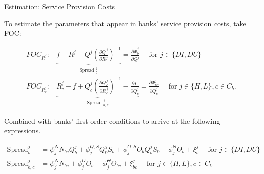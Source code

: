 \documentclass[notes,10pt, aspectratio=169]{beamer}
\newenvironment{wideitemize}{\itemize\addtolength{\itemsep}{10pt}}{\enditemize}
\begin{document}
\begin{frame}{Estimation: Service Provision Costs}

        \vspace{0.3cm}
        \begin{wideitemize}

            \item To estimate the parameters that appear in banks' service provision costs, take FOC:
            
            $$
            \begin{aligned}
            F O C_{R^j}: & \underbrace{f-R^j-Q^j\left(\frac{\partial Q^j}{\partial R^j}\right)^{-1}}_{\text {Spread }_b^j}=\frac{\partial \Phi_b^j}{\partial Q^j} \quad \text { for } j \in\{D I, D U\} \\
            F O C_{R_c^j}: & \underbrace{R_c^j-f+Q_c^j\left(\frac{\partial Q_c^j}{\partial R_c^j}\right)^{-1}-\frac{\partial L}{\partial Q_c^j}}_{\text {Spread }_{b, c}^j}=\frac{\partial \Phi_{b c}^j}{\partial Q_c^j} \quad \text { for } j \in\{H, L\}, c \in C_b .
            \end{aligned}
            $$
            
            
            \item Combined with banks' first order conditions to arrive at the following expressions.
            
            $$
            \begin{aligned}
            \operatorname{Spread}_b^j & =\phi_j^N N_{b c} Q_b^j+\phi_j^{Q, S} Q_b^j S_b+\phi_j^{O, S} O_b Q_b^j S_b+\phi_j^{\Theta} \Theta_b+\xi_b^j \quad \text { for } j \in\{D I, D U\} \\
            \operatorname{Spread}_{b, c}^j & =\phi_j^N N_{b c}+\phi_j^O O_b+\phi_j^{\Theta} \Theta_{b c}+\xi_{b c}^j \quad \text { for } j \in\{H, L\}, c \in C_b
            \end{aligned}
            $$
            
    \end{wideitemize}

\end{frame}
\end{document}
